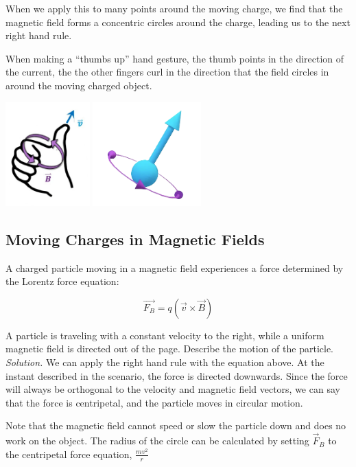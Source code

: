 \documentclass[12pt, titlepage]{article}
\begin{document}
When we apply this to many points around the moving charge, we find that the magnetic field forms a concentric circles around the charge, leading us to the next right hand rule.

When making a ``thumbs up'' hand gesture, the thumb points in the direction of the current, the the other fingers curl in the direction that the field circles in around the moving charged object.
\begin{center}
    \includegraphics[height=4cm]{media/rh2_2.png}
    \includegraphics[height=4cm]{media/rh2.png}
\end{center}

\subsection*{Moving Charges in Magnetic Fields}

A charged particle moving in a magnetic field experiences a force determined by the Lorentz force equation:

\begin{equation*}
    \vec{F_B} = q(\vec{v}\times\vec{B})
\end{equation*}
\begin{Problem}
    A particle is traveling with a constant velocity to the right, while a uniform magnetic field is directed out of the page. Describe the motion of the particle.
    \tcblower
    \textit{Solution. } We can apply the right hand rule with the equation above. At the instant described in the scenario, the force is directed downwards. Since the force will always be orthogonal to the velocity and magnetic field vectors, we can say that the force is centripetal, and the particle moves in circular motion.
    
    Note that the magnetic field cannot speed or slow the particle down and does no work on the object. The radius of the circle can be calculated by setting $\vec{F}_B$ to the centripetal force equation, $\frac{mv^2}{r}$
\end{Problem}
\end{document}
